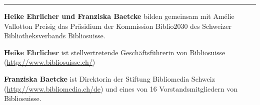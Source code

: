 \begin{center}\rule{0.5\linewidth}{0.5pt}\end{center}

\textbf{Heike Ehrlicher und Franziska Baetcke} bilden gemeinsam mit
Amélie Vallotton Preisig das Präsidium der Kommission Biblio2030 des
Schweizer Bibliotheksverbands Bibliosuisse.

\textbf{Heike Ehrlicher} ist stellvertretende Geschäftsführerin von
Bibliosuisse (\url{http://www.bibliosuisse.ch/})

\textbf{Franziska Baetcke} ist Direktorin der Stiftung Bibliomedia
Schweiz (\url{http://www.bibliomedia.ch/de}) und eines von 16
Vorstandsmitgliedern von Bibliosuisse.
